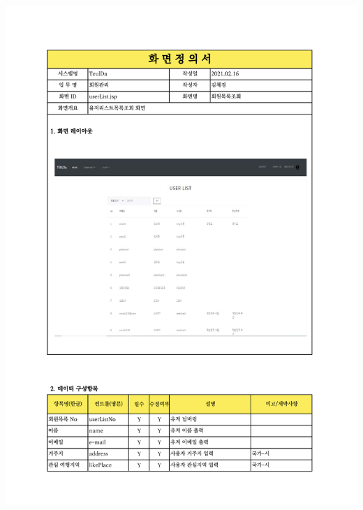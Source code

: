 {{{{{{{{{{{{{{{{{\includegraphics[width=20cm]{./Figure/Design/Display/user/user_17.pdf} \\
}}}}}}}}}}}}}}}}}
